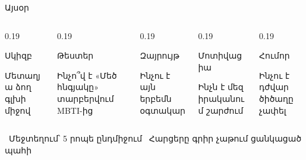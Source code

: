 \begin{frame}{Այսօր}
  \begin{columns}[T]
    \begin{column}{0.19\textwidth}
      \begin{card}[left=1.3mm, right=1.3mm, colback=butter!45!cream]
        \centering{}\par\smallskip
        {\blackfont Սկիզբ}\par\smallskip
        \raggedright Մետաղյա ձող գլխի միջով
      \end{card}
    \end{column}
    \begin{column}{0.19\textwidth}
      \begin{card}[left=1.3mm, right=1.3mm, colback=lavender!45!cream]
        \centering{}\par\smallskip
        {\blackfont Թեստեր}\par\smallskip
        \raggedright Ինչո՞վ է «Մեծ հնգյակը» տարբերվում MBTI-ից
      \end{card}
    \end{column}
    \begin{column}{0.19\textwidth}
      \begin{card}[left=1.3mm, right=1.3mm, colback=brainpink!40!cream]
        \centering{}\par\smallskip
        {\blackfont Զայրույթ}\par\smallskip
        \raggedright Ինչու է այն երբեմն օգտակար
      \end{card}
    \end{column}
    \begin{column}{0.19\textwidth}
      \begin{card}[left=1.3mm, right=1.3mm, colback=mint!45!cream]
        \centering{}\par\smallskip
        {\blackfont Մոտիվացիա}\par\smallskip
        \raggedright Ինչն է մեզ իրականում շարժում
      \end{card}
    \end{column}
    \begin{column}{0.19\textwidth}
      \begin{card}[left=1.3mm, right=1.3mm, colback=peach!45!cream]
        \centering{}\par\smallskip
        {\blackfont Հումոր}\par\smallskip
        \raggedright Ինչու է դժվար ծիծաղը չափել
      \end{card}
    \end{column}
  \end{columns}
  \vspace{4mm}
  \centering
  {\small {}\ Մեջտեղում՝ 5 րոպե ընդմիջում \qquad {}\ Հարցերը գրիր չաթում ցանկացած պահի}
\end{frame}
